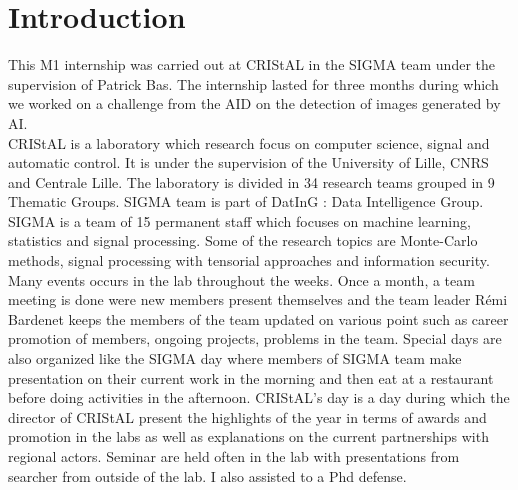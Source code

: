 \documentclass[12pt,a4paper]{article}
\begin{document}
\section*{Introduction}
This M1 internship was carried out at CRIStAL in the SIGMA team under the supervision of Patrick Bas. The internship lasted for three months during which we worked on a challenge from the AID on the detection of images generated by AI.\\
CRIStAL is a laboratory which research focus on computer science, signal and automatic control. It is under the supervision of the University of Lille, CNRS and Centrale Lille. The laboratory is divided in 34 research teams grouped in 9 Thematic Groups. SIGMA team is part of DatInG : Data Intelligence Group. SIGMA is a team of 15 permanent staff which focuses on machine learning, statistics and signal processing. Some of the research topics are Monte-Carlo methods, signal processing with tensorial approaches and information security.
Many events occurs in the lab throughout the weeks. Once a month, a team meeting is done were new members present themselves and the team leader Rémi Bardenet keeps the members of the team updated on various point such as career promotion of members, ongoing projects, problems in the team. Special days are also organized like the SIGMA day where members of SIGMA team make presentation on their current work in the morning and then eat at a restaurant before doing activities in the afternoon. CRIStAL's day is a day during which the director of CRIStAL present the highlights of the year in terms of awards and promotion in the labs as well as explanations on the current partnerships with regional actors. Seminar are held often in the lab with presentations from searcher from outside of the lab. I also assisted to a Phd defense.
\end{document}
